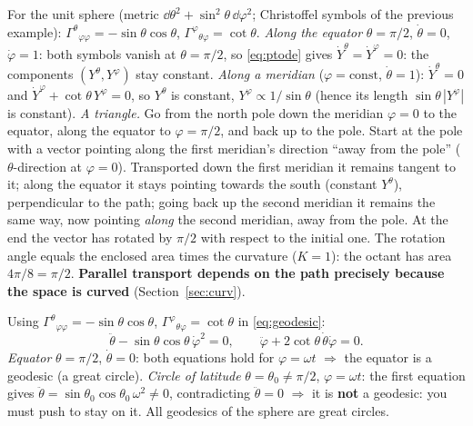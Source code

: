 \begin{example}\label{ex:spheretransport}
For the unit sphere (metric $\dd\theta^2+\sin^2\theta\,\dd\varphi^2$; Christoffel symbols of the previous example): $\Gamma^\theta{}_{\varphi\varphi}=-\sin\theta\cos\theta$, $\Gamma^\varphi{}_{\theta\varphi}=\cot\theta$. 
\emph{Along the equator} $\theta=\pi/2$, $\dot\theta=0$, $\dot\varphi=1$: both symbols vanish at $\theta=\pi/2$, so \eqref{eq:ptode} gives $\dot Y^\theta=\dot Y^\varphi=0$: the components $(Y^\theta,Y^\varphi)$ stay constant.
\emph{Along a meridian} ($\varphi=\mathrm{const}$, $\dot\theta=1$): $\dot Y^\theta=0$ and $\dot Y^\varphi+\cot\theta\,Y^\varphi=0$, so $Y^\theta$ is constant, $Y^\varphi\propto 1/\sin\theta$ (hence its length $\sin\theta\,|Y^\varphi|$ is constant).
\emph{A triangle.} Go from the north pole down the meridian $\varphi=0$ to the equator, along the equator to $\varphi=\pi/2$, and back up to the pole. Start at the pole with a vector pointing along the first meridian's direction ``away from the pole'' ($\theta$-direction at $\varphi=0$). Transported down the first meridian it remains tangent to it; along the equator it stays pointing towards the south (constant $Y^\theta$), perpendicular to the path; going back up the second meridian it remains the same way, now pointing \emph{along} the second meridian, away from the pole. At the end the vector has rotated by $\pi/2$ with respect to the initial one. The rotation angle equals the enclosed area times the curvature ($K=1$): the octant has area $4\pi/8=\pi/2$. \textbf{Parallel transport depends on the path precisely because the space is curved} (Section~\ref{sec:curv}).
\end{example}

\begin{example}\label{ex:spheregeod}
Using $\Gamma^\theta{}_{\varphi\varphi}=-\sin\theta\cos\theta$, $\Gamma^\varphi{}_{\theta\varphi}=\cot\theta$ in \eqref{eq:geodesic}:
\[
\ddot\theta-\sin\theta\cos\theta\,\dot\varphi^2=0,\qquad\ddot\varphi+2\cot\theta\,\dot\theta\dot\varphi=0 .
\]
\textit{Equator} $\theta=\pi/2$, $\dot\theta=0$: both equations hold for $\varphi=\omega t$ $\Rightarrow$ the equator is a geodesic (a great circle). \textit{Circle of latitude} $\theta=\theta_0\neq\pi/2$, $\varphi=\omega t$: the first equation gives $\ddot\theta=\sin\theta_0\cos\theta_0\,\omega^2\neq0$, contradicting $\ddot\theta=0$ $\Rightarrow$ it is \textbf{not} a geodesic: you must push to stay on it. All geodesics of the sphere are great circles.
\end{example}
